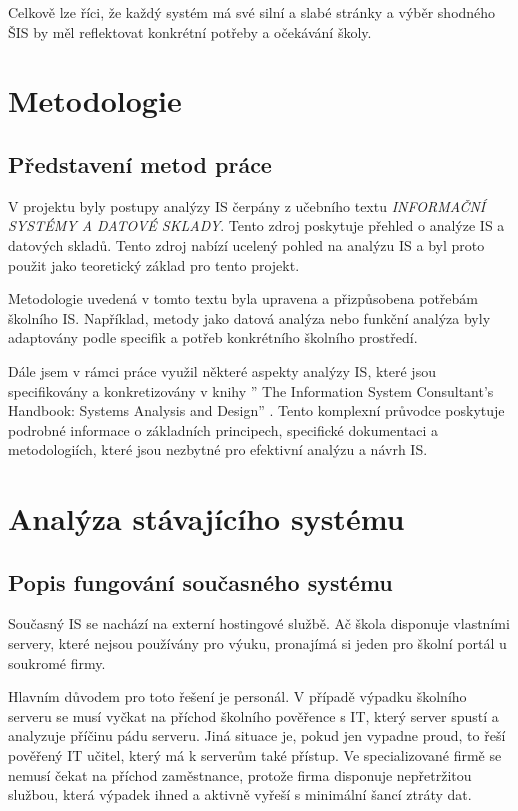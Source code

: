\documentclass[FM,Proj]{tulthesis}
\begin{document}
Celkově lze říci, že každý systém má své silní a slabé stránky a výběr shodného ŠIS
by měl reflektovat konkrétní potřeby a očekávání školy.

\chapter{Metodologie}
\section{Představení metod práce}
V projektu byly postupy analýzy IS čerpány z učebního textu 
\textit{INFORMAČNÍ SYSTÉMY A DATOVÉ SKLADY}\cite{Sarmanova2008ISaDS}. Tento zdroj poskytuje
přehled o analýze IS a datových skladů. Tento zdroj nabízí ucelený pohled
na analýzu IS a byl proto použit jako teoretický základ
pro tento projekt.

Metodologie uvedená v tomto textu byla upravena a přizpůsobena potřebám školního IS.
Například, metody jako datová analýza nebo funkční analýza byly adaptovány podle
specifik a potřeb konkrétního školního prostředí.

Dále jsem v rámci práce využil některé aspekty analýzy
IS, které jsou specifikovány a
konkretizovány v knihy '' The Information System 
Consultant's Handbook: Systems Analysis and Design''
\cite{davis2019information}. Tento komplexní průvodce
poskytuje podrobné informace o základních principech,
specifické dokumentaci a metodologiích, 
které jsou nezbytné pro efektivní analýzu a návrh
IS.

\chapter{Analýza stávajícího systému}
\section{Popis fungování současného systému}
Současný IS se nachází na externí hostingové službě. Ač škola disponuje vlastními 
servery, které nejsou používány pro výuku, pronajímá si jeden pro školní portál u soukromé firmy.

Hlavním důvodem pro toto řešení je personál. V případě výpadku školního serveru 
se musí vyčkat na příchod školního pověřence s IT, který server spustí a analyzuje 
příčinu pádu serveru. Jiná situace je, pokud jen vypadne proud, to řeší pověřený 
IT učitel, který má k serverům také přístup. Ve specializované firmě se nemusí 
čekat na příchod zaměstnance, protože firma disponuje nepřetržitou službou, která výpadek 
ihned a aktivně vyřeší s minimální šancí ztráty dat. 
\end{document}
